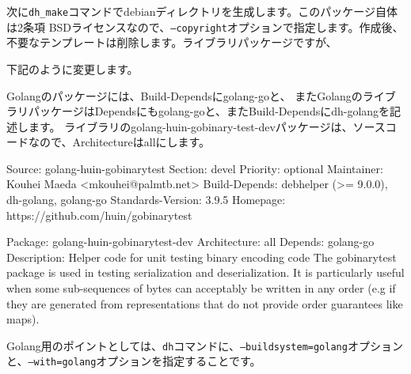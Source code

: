 \documentclass[mingoth,a4paper]{jsarticle}
\begin{document}
次に\texttt{dh\_make}コマンドでdebianディレクトリを生成します。このパッケージ自体は2条項 BSDライセンスなので、\texttt{--copyright}オプションで指定します。作成後、不要なテンプレートは削除します。ライブラリパッケージですが、


下記のように変更します。


Golangのパッケージには、Build-Dependsにgolang-goと、
またGolangのライブラリパッケージはDependsにもgolang-goと、またBuild-Dependsにdh-golangを記述します。
ライブラリのgolang-huin-gobinary-test-devパッケージは、ソースコードなので、Architectureはallにします。

\begin{commandline}
Source: golang-huin-gobinarytest
Section: devel
Priority: optional
Maintainer: Kouhei Maeda <mkouhei@palmtb.net>
Build-Depends: debhelper (>= 9.0.0), dh-golang, golang-go
Standards-Version: 3.9.5
Homepage: https://github.com/huin/gobinarytest

Package: golang-huin-gobinarytest-dev
Architecture: all
Depends: golang-go
Description: Helper code for unit testing binary encoding code
 The gobinarytest package is used in testing serialization and
 deserialization. It is particularly useful when some sub-sequences of bytes
 can acceptably be written in any order (e.g if they are generated from
 representations that do not provide order guarantees like maps).
\end{commandline}

Golang用のポイントとしては、\texttt{dh}コマンドに、\texttt{--buildsystem=golang}オプションと、\texttt{--with=golang}オプションを指定することです。
\end{document}
